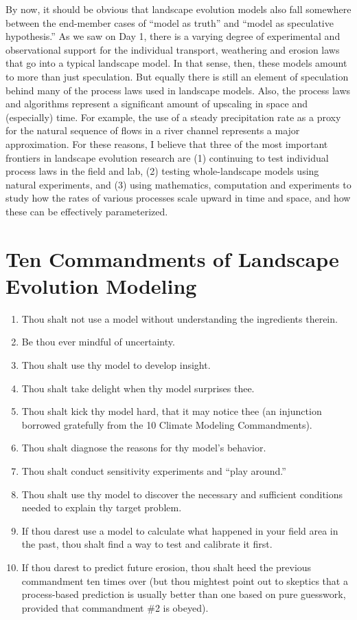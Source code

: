 \documentclass[12pt]{amsart}
\begin{document}
By now, it should be obvious that landscape evolution models also fall somewhere between the end-member cases of ``model as truth'' and ``model as speculative hypothesis.'' As we saw on Day 1, there is a varying degree of experimental and observational support for the individual transport, weathering and erosion laws that go into a typical landscape model. In that sense, then, these models amount to more than just speculation. But equally there is still an element of speculation behind many of the process laws used in landscape models. Also, the process laws and algorithms represent a significant amount of upscaling in space and (especially) time. For example, the use of a steady precipitation rate as a proxy for the natural sequence of flows in a river channel represents a major approximation. For these reasons, I believe that three of the most important frontiers in landscape evolution research are (1) continuing to test individual process laws in the field and lab, (2) testing whole-landscape models using natural experiments, and (3) using mathematics, computation and experiments to study how the rates of various processes scale upward in time and space, and how these can be effectively parameterized.

\section{Ten Commandments of Landscape Evolution Modeling}

\begin{enumerate}
\item Thou shalt not use a model without understanding the ingredients therein.
\item Be thou ever mindful of uncertainty.
\item Thou shalt use thy model to develop insight.
\item Thou shalt take delight when thy model surprises thee.
\item Thou shalt kick thy model hard, that it may notice thee (an injunction borrowed gratefully from the 10 Climate Modeling Commandments).
\item Thou shalt diagnose the reasons for thy model's behavior.
\item Thou shalt conduct sensitivity experiments and ``play around.''
\item Thou shalt use thy model to discover the necessary and sufficient conditions needed to explain thy target problem.
\item If thou darest use a model to calculate what happened in your field area in the past, thou shalt find a way to test and calibrate it first.
\item If thou darest to predict future erosion, thou shalt heed the previous commandment ten times over (but thou mightest point out to skeptics that a process-based prediction is usually better than one based on pure guesswork, provided that commandment \#2 is obeyed).
\end{enumerate}



\end{document}
